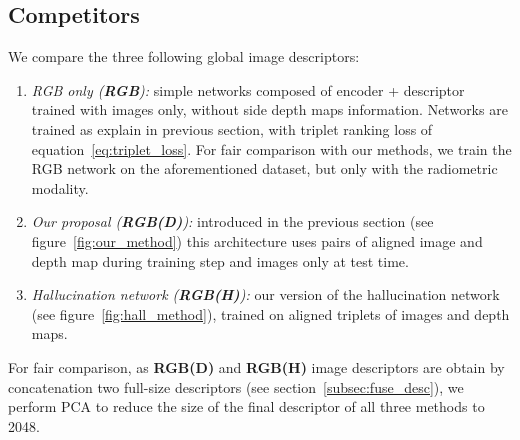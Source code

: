 \subsection{Competitors}
\label{subsec:competitors}
We compare the three following global image descriptors:
\begin{enumerate}
    \item \textit{RGB only (\textbf{RGB}):} simple networks composed of encoder + descriptor trained with images only, without side depth maps information. Networks are trained as explain in previous section, with triplet ranking loss of equation~\ref{eq:triplet_loss}. For fair comparison with our methods, we train the RGB network on the aforementioned dataset, but only with the radiometric modality.
    \item \textit{Our proposal (\textbf{RGB(D)}):} introduced in the previous section (see figure~\ref{fig:our_method}) this architecture uses pairs of aligned image and depth map during training step and images only at test time.
	\item \textit{Hallucination network (\textbf{RGB(H)}):} our version of the hallucination network~\cite{Hoffman2016} (see figure~\ref{fig:hall_method}), trained on aligned triplets of images and depth maps.
\end{enumerate}

For fair comparison, as \textbf{RGB(D)} and \textbf{RGB(H)} image descriptors are obtain by concatenation two full-size descriptors (see section~\ref{subsec:fuse_desc}), we perform PCA to reduce the size of the final descriptor of all three methods to 2048.